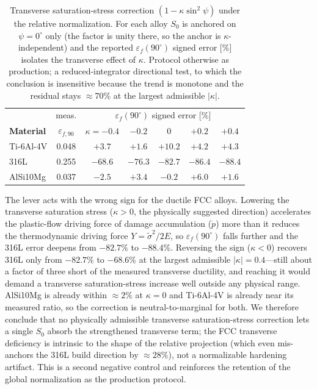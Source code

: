 \documentclass[11pt,a4paper,twocolumn]{article}
\begin{document}
\begin{table}[htbp]
\centering
\caption{Transverse saturation-stress correction $(1-\kappa\sin^2\psi)$ under the relative normalization. For each alloy $S_0$ is anchored on $\psi=0^\circ$ only (the factor is unity there, so the anchor is $\kappa$-independent) and the reported $\varepsilon_f(90^\circ)$ signed error [\%] isolates the transverse effect of $\kappa$. Protocol otherwise as production; a reduced-integrator directional test, to which the conclusion is insensitive because the trend is monotone and the residual stays $\approx70\%$ at the largest admissible $|\kappa|$.}
\label{tab:satcorr}
\footnotesize
\setlength{\tabcolsep}{4pt}
\begin{tabular}{l c ccccc}
\toprule
 & meas. & \multicolumn{5}{c}{$\varepsilon_f(90^\circ)$ signed error [\%]} \\
\textbf{Material} & $\varepsilon_{f,90}$ & $\kappa=-0.4$ & $-0.2$ & $0$ & $+0.2$ & $+0.4$ \\
\midrule
Ti-6Al-4V  & 0.048 & $+3.7$ & $+1.6$ & $+10.2$ & $+4.2$ & $+4.3$ \\
316L       & 0.255 & $-68.6$ & $-76.3$ & $-82.7$ & $-86.4$ & $-88.4$ \\
AlSi10Mg   & 0.037 & $-2.5$ & $+3.4$ & $-0.2$ & $+6.0$ & $+1.6$ \\
\bottomrule
\end{tabular}
\end{table}

The lever acts with the wrong sign for the ductile FCC alloys. Lowering the transverse saturation stress ($\kappa>0$, the physically suggested direction) accelerates the plastic-flow driving force of damage accumulation ($\dot p$) more than it reduces the thermodynamic driving force $Y=\tilde\sigma^2/2E$, so $\varepsilon_f(90^\circ)$ falls further and the 316L error deepens from $-82.7\%$ to $-88.4\%$. Reversing the sign ($\kappa<0$) recovers 316L only from $-82.7\%$ to $-68.6\%$ at the largest admissible $|\kappa|=0.4$---still about a factor of three short of the measured transverse ductility, and reaching it would demand a transverse saturation-stress increase well outside any physical range. AlSi10Mg is already within $\approx2\%$ at $\kappa=0$ and Ti-6Al-4V is already near its measured ratio, so the correction is neutral-to-marginal for both. We therefore conclude that no physically admissible transverse saturation-stress correction lets a single $S_0$ absorb the strengthened transverse term; the FCC transverse deficiency is intrinsic to the shape of the relative projection (which even mis-anchors the 316L build direction by $\approx28\%$), not a normalizable hardening artifact. This is a second negative control and reinforces the retention of the global normalization as the production protocol.
\end{document}
